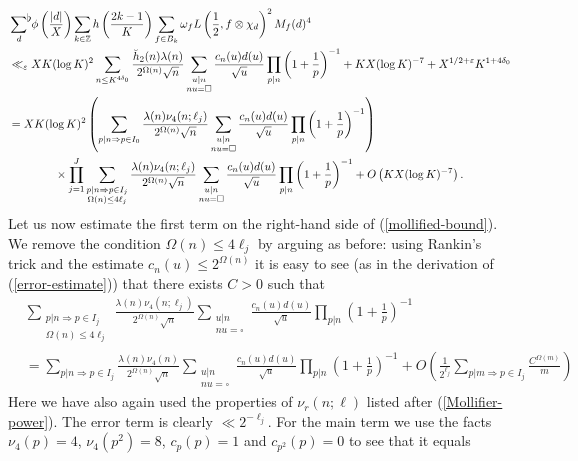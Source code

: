 \documentclass[a4paper,10pt,twoside]{amsart}
\theoremstyle{definition}
\numberwithin{equation}{section}
\newcommand\Z{\mathbb{Z}}
\newcommand\eps{\varepsilon}
\renewcommand\:{\colon}
\newcommand{\sumflat}{\mathop{{\sum}^{\raisebox{-3pt}{\makebox[0pt][l]{$\flat$}}}}}
\begin{document}
\begin{align}\label{mollified-bound}
&\sumflat_{d}\,\phi\left(\frac{|d|}X\right)\sum_{k\in\Z}h\left(\frac{2k-1}K\right)\sum_{f\in B_k}\omega_f  L\left(\frac12,f\otimes\chi_d\right)^2 M_f(d)^4 \nonumber \\
&\ll_\eps XK(\log K)^2\sum_{n\leq K^{4\delta_0}}\frac{\breve h_2(n)\lambda(n)}{2^{\Omega(n)}\sqrt n}\sum_{\substack{u|n\\
nu=\square}}\frac{c_n(u)d(u)}{\sqrt u}\prod_{p|n}\left(1+\frac1p\right)^{-1}+KX(\log K)^{-7}+X^{1/2+\eps}K^{1+4\delta_0} \nonumber\\
&= XK(\log K)^2\left(\sum_{p|n\Rightarrow p\in I_0}\frac{\lambda(n)\nu_4(n;\ell_j)}{2^{\Omega(n)}\sqrt n}\sum_{\substack{u|n\\
nu=\square}}\frac{c_n(u)d(u)}{\sqrt u}\prod_{p|n}\left(1+\frac1p\right)^{-1}\right) \nonumber\\
&\qquad\qquad\times\prod_{j=1}^J\sum_{\substack{p|n\Rightarrow p\in I_j\\
\Omega(n)\leq 4\ell_j}}\frac{\lambda(n)\nu_4(n;\ell_j)}{2^{\Omega(n)}\sqrt n}\sum_{\substack{u|n\\
nu=\square}}\frac{c_n(u)d(u)}{\sqrt u}\prod_{p|n}\left(1+\frac1p\right)^{-1}+O\left(KX(\log K)^{-7}\right).
\end{align}
Let us now estimate the first term on the right-hand side of (\ref{mollified-bound}). We remove the condition $\Omega(n)\leq 4\ell_j$ by arguing as before: using Rankin's trick and the estimate $c_n(u)\leq 2^{\Omega(n)}$ it is easy to see (as in the derivation of (\ref{error-estimate})) that there exists $C>0$ such that 
\begin{align*}
&\sum_{\substack{p|n\Rightarrow p\in I_j\\
\Omega(n)\leq 4\ell_j}}\frac{\lambda(n)\nu_4(n;\ell_j)}{2^{\Omega(n)}\sqrt n}\sum_{\substack{u|n\\
nu=\square}}\frac{c_n(u)d(u)}{\sqrt u}\prod_{p|n}\left(1+\frac1p\right)^{-1}\\
&=\sum_{p|n\Rightarrow p\in I_j}\frac{\lambda(n)\nu_4(n)}{2^{\Omega(n)}\sqrt n}\sum_{\substack{u|n\\
nu=\square}}\frac{c_n(u)d(u)}{\sqrt u}\prod_{p|n}\left(1+\frac1p\right)^{-1}+O\left(\frac1{2^{\ell_j}}\sum_{p|m\Rightarrow p\in I_j}\frac{C^{\Omega(m)}}m\right)
\end{align*}
Here we have also again used the properties of $\nu_r(n;\ell)$ listed after (\ref{Mollifier-power}). The error term is clearly $\ll 2^{-\ell_j}$. For the main term we use the facts $\nu_4(p)=4$, $\nu_4(p^2)=8$, $c_p(p)=1$ and $c_{p^2}(p)=0$ to see that it equals
\end{document}
